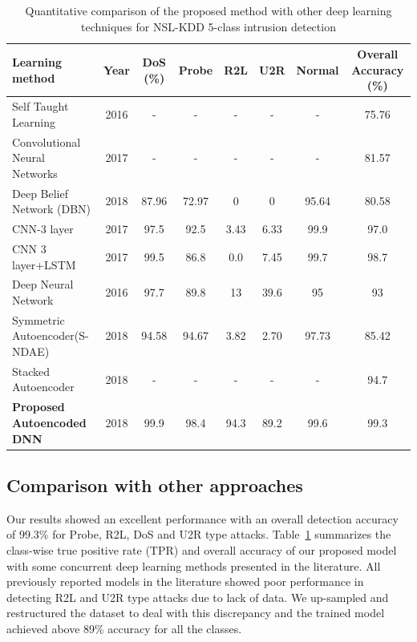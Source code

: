 \documentclass[runningheads]{llncs}
\newcommand{\tab}[1]{Table~\ref{#1}}
\newcommand{\otoprule}{\midrule[\heavyrulewidth]}
\begin{document}
     \begin{table}
     \centering
    \caption{Quantitative comparison of the proposed method with other deep learning techniques for NSL-KDD 5-class intrusion detection}   \label{table:performance_comparison}
  \begin{tabularx}{\textwidth}{X c c c c c c c}
    \toprule
    Learning method & Year  & DoS (\%) &Probe&R2L&U2R&Normal& Overall Accuracy (\%) \\
    \otoprule
    Self Taught Learning \cite{Javaid2016}&2016&-&-&-&-&-&75.76\\
    Convolutional Neural Networks  \cite{Li2017}& 2017  &-&-&-&-&-& 81.57 \\ 
    
    Deep Belief Network (DBN)  \cite{Shone2018}& 2018 &87.96&72.97 &0&0&95.64  &80.58  \\
   CNN-3 layer\cite{Vinay2017}& 2017 &97.5&92.5&3.43&6.33&99.9& 97.0  \\ 
    CNN 3 layer+LSTM \cite{Vinay2017} & 2017 &99.5&86.8&0.0&7.45&99.7& 98.7 \\ 
   
    \hline
   Deep Neural Network \cite{potluri2016}&2016 &97.7&89.8&13&39.6&95  & 93 \\
    Symmetric Autoencoder(S-NDAE)  \cite{Shone2018}&2018 &94.58&94.67&3.82&2.70 &97.73& 85.42 \\
    Stacked Autoencoder \cite{Farah2018}&2018 &-&-&-&-& - & 94.7 \\
   
    
 \bf{    Proposed Autoencoded DNN} &  2018  &99.9&98.4&94.3&89.2&99.6 &99.3 \\
    \bottomrule
  \end{tabularx}
\end{table}



\subsection{Comparison with other approaches}

Our results showed an excellent performance with an overall detection accuracy of  99.3\% for Probe, R2L, DoS and U2R type attacks. \tab{table:performance_comparison} summarizes the class-wise true positive rate (TPR) and overall accuracy of our proposed model with some concurrent deep learning methods presented in the literature. All previously reported models in the literature showed poor performance in detecting R2L and U2R type attacks due to lack of data. We up-sampled and restructured the dataset to deal with this discrepancy and the trained model achieved above 89\% accuracy for all the classes. 
   
\end{document}
